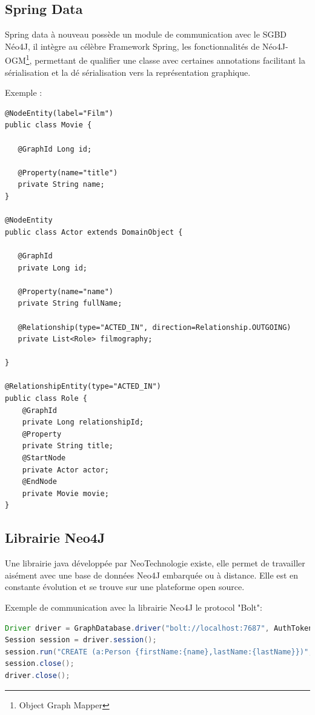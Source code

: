 \documentclass[a4paper,fleqn,12pt]{report}
\begin{document}
\subsection{Spring Data}

Spring data à nouveau possède un module de communication avec le SGBD Néo4J, il intègre au célèbre Framework Spring, les fonctionnalités de Néo4J-OGM\footnote{Object Graph Mapper}, permettant de qualifier une classe avec certaines annotations facilitant la sérialisation et la dé sérialisation vers la représentation graphique.

Exemple : 

\begin{lstlisting}
@NodeEntity(label="Film")
public class Movie {

   @GraphId Long id;

   @Property(name="title")
   private String name;
}

@NodeEntity
public class Actor extends DomainObject {

   @GraphId
   private Long id;

   @Property(name="name")
   private String fullName;

   @Relationship(type="ACTED_IN", direction=Relationship.OUTGOING)
   private List<Role> filmography;

}

@RelationshipEntity(type="ACTED_IN")
public class Role {
    @GraphId   
    private Long relationshipId;
    @Property  
    private String title;
    @StartNode 
    private Actor actor;
    @EndNode   
    private Movie movie;
}
\end{lstlisting}

\subsection{Librairie Neo4J}

Une librairie java développée par NeoTechnologie existe, elle permet de travailler aisément avec une base de données Neo4J embarquée ou à distance. Elle est en constante évolution et se trouve sur une plateforme open source. 

Exemple de communication avec la librairie Neo4J le protocol "Bolt":

\begin{lstlisting}[language=java]
Driver driver = GraphDatabase.driver("bolt://localhost:7687", AuthTokens.basic("matrix", "neo"));
Session session = driver.session();
session.run("CREATE (a:Person {firstName:{name},lastName:{lastName}})", parameters("firstName","Gilles","lastName","Bodart"));
session.close();
driver.close();

\end{lstlisting}
\end{document}
